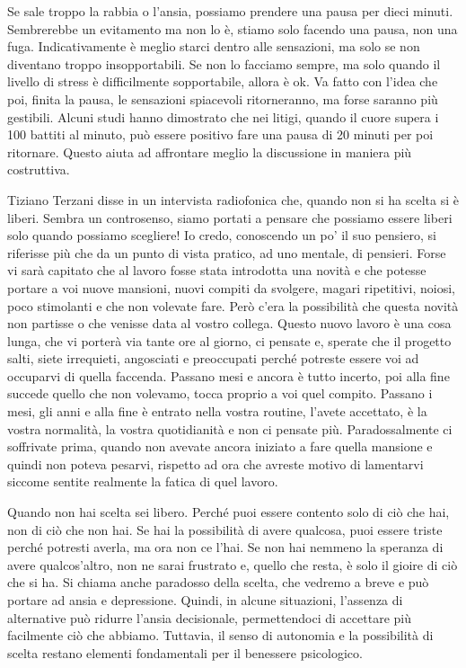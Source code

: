 \documentclass[12pt]{book} %
\begin{document}
Se sale troppo la rabbia o l'ansia, possiamo prendere una pausa per dieci minuti. Sembrerebbe un evitamento ma non lo è,
stiamo solo facendo una pausa, non una fuga. Indicativamente è meglio starci dentro alle sensazioni, ma solo se non
diventano troppo insopportabili. Se non lo facciamo sempre, ma solo quando il livello di stress è difficilmente
sopportabile, allora è ok. Va fatto con l'idea che poi, finita la pausa, le sensazioni spiacevoli ritorneranno, ma
forse saranno più gestibili. Alcuni studi hanno dimostrato che nei litigi, quando il cuore supera i 100 battiti al
minuto, può essere positivo fare una pausa di 20 minuti per poi ritornare. Questo aiuta ad affrontare meglio la
discussione in maniera più costruttiva. 

Tiziano Terzani disse in un intervista radiofonica che, quando non si ha scelta si è liberi. Sembra un controsenso,
siamo portati a pensare che possiamo essere liberi solo quando possiamo scegliere! Io credo, conoscendo un
po' il suo pensiero, si riferisse più che da un punto di vista pratico, ad uno mentale, di
pensieri. Forse vi sarà capitato che al lavoro fosse stata introdotta una novità e che potesse portare a voi nuove
mansioni, nuovi compiti da svolgere, magari ripetitivi, noiosi, poco stimolanti e che non volevate fare. Però
c'era la possibilità che questa novità non partisse o che venisse data al vostro collega. Questo
nuovo lavoro è una cosa lunga, che vi porterà via tante ore al giorno, ci pensate e, sperate che il progetto salti,
siete irrequieti, angosciati e preoccupati perché potreste essere voi ad occuparvi di quella faccenda. Passano mesi e
ancora è tutto incerto, poi alla fine succede quello che non volevamo, tocca proprio a voi quel compito. Passano i
mesi, gli anni e alla fine è entrato nella vostra routine, l'avete accettato, è la vostra
normalità, la vostra quotidianità e non ci pensate più. Paradossalmente ci soffrivate prima, quando non avevate ancora
iniziato a fare quella mansione e quindi non poteva pesarvi, rispetto ad ora che avreste motivo di lamentarvi siccome
sentite realmente la fatica di quel lavoro.

Quando non hai scelta sei libero. Perché puoi essere contento solo di ciò che hai, non di ciò che non hai. Se hai la
possibilità di avere qualcosa, puoi essere triste perché potresti averla, ma ora non ce l'hai. Se
non hai nemmeno la speranza di avere qualcos'altro, non ne sarai frustrato e, quello che resta, è solo il gioire di ciò
che si ha. Si chiama anche paradosso della scelta, che vedremo a breve e può portare ad ansia e depressione.
Quindi, in alcune situazioni, l’assenza di alternative può ridurre l’ansia decisionale, permettendoci di accettare più facilmente ciò che abbiamo. Tuttavia, il senso di autonomia e la possibilità di scelta restano elementi fondamentali per il benessere psicologico.
\end{document}
